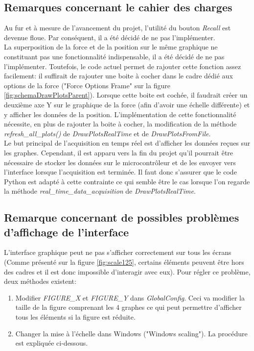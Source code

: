 \subsection{Remarques concernant le cahier des charges}
Au fur et à mesure de l'avancement du projet, l'utilité du bouton \textit{Recall} est devenue floue. Par conséquent, il a été décidé de ne pas l'implémenter.\\

La superposition de la force et de la position sur le même graphique ne constituant pas une fonctionnalité indispensable, il a été décidé de ne pas l'implémenter. Toutefois, le code actuel permet de rajouter cette fonction assez facilement: il suffirait de rajouter une boite à cocher dans le cadre dédié aux options de la force ("Force Options Frame" sur la figure \ref{fig:schemaDrawPlotsParent}). Lorsque cette boite est cochée, il faudrait créer un deuxième axe Y sur le graphique de la force (afin d'avoir une échelle différente) et y afficher les données de la position. L'implémentation de cette fonctionnalité nécessite, en plus de rajouter la boite à cocher, la modification de la méthode \textit{refresh\_all\_plots()} de \textit{DrawPlotsRealTime} et de \textit{DrawPlotsFromFile}.\\

Le but principal de l'acquisition en temps réel est d'afficher les données reçues sur les graphes. Cependant, il est apparu vers la fin du projet qu'il pourrait être nécessaire de stocker les données sur le microcontrôleur et de les envoyer vers l'interface lorsque l'acquisition est terminée. Il faut donc s'assurer que le code Python est adapté à cette contrainte ce qui semble être le cas lorsque l'on regarde la méthode \textit{real\_time\_data\_acquisition} de \textit{DrawPlotsRealTime}.

\subsection{Remarque concernant de possibles problèmes d'affichage de l'interface}

L'interface graphique peut ne pas s'afficher correctement sur tous les écrans (Comme présenté sur la figure \ref{fig:scale125}, certains éléments peuvent être hors des cadres et il est donc impossible d'interagir avec eux). Pour régler ce problème, deux méthodes existent:
\begin{enumerate}
    \item Modifier \textit{FIGURE\_X} et \textit{FIGURE\_Y} dans \textit{GlobalConfig}. Ceci va modifier la taille de la figure comprenant les 4 graphes ce qui peut permettre d'afficher tous les éléments si la figure est réduite.
    
    \item Changer la mise à l'échelle dans Windows ("Windows scaling"). La procédure est expliquée ci-dessous.
\end{enumerate}


